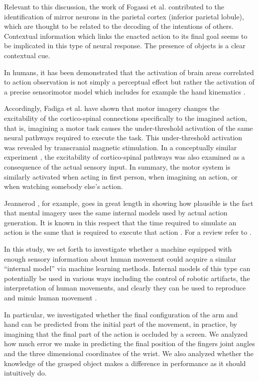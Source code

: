 Relevant to this discussion, the work of Fogassi et al. \cite{fogassi-05} contributed to the 
identification of mirror neurons in the parietal cortex (inferior parietal lobule), which are 
thought to be related to the decoding of the intentions of others. Contextual information 
which links the enacted action to its final goal seems to be implicated in this type of neural 
response. The presence of objects is a clear contextual cue.

In humans, it has been demonstrated that the activation of brain areas correlated to 
action observation is not simply a perceptual effect but rather the activation of
a precise sensorimotor model which includes for example the hand kinematics \cite{pozzo-06}.
 
Accordingly, Fadiga et al. \cite{fadiga-99,vargas-04} have shown that motor imagery changes
the excitability of the cortico-spinal connections specifically to the imagined action, that is, 
imagining a motor task causes the under-threshold activation of the same neural pathways 
required to execute the task. This under-threshold activation was revealed 
by transcranial magnetic stimulation. In a conceptually similar experiment 
\cite{fadiga-05}, the excitability of cortico-spinal pathways was also examined as a consequence 
of the actual sensory input. In summary, the motor system is similarly activated 
when acting in first person, when imagining an action, or when watching somebody else's action.


Jeannerod \cite{jeannerod-88}, for example, goes in great length in showing how plausible is 
the fact that mental imagery uses the same internal models used by actual action generation. 
It is known in this respect that the time required to simulate an action is the same that 
is required to execute that action \cite{sirigu-96}. For a review refer to \cite{jeannerod-99}.

In this study, we set forth to investigate whether a machine equipped with enough sensory 
information about human movement could acquire a similar ``internal model'' via machine 
learning methods. Internal models of this type can potentially be used in various ways
including the control of robotic artifacts, the interpretation of human movements, and 
clearly they can be used to reproduce and mimic human movement \cite{wolpert-01}. 

In particular, we investigated whether the final configuration of the arm and hand can be
predicted from the initial part of the movement, in practice, by imagining that the 
final part of the action is occluded by a screen. We analyzed how much error we make in 
predicting the final position of the fingers joint angles and the three dimensional 
coordinates of the wrist. We also analyzed whether the knowledge of the grasped object 
makes a difference in performance as it should intuitively do.

